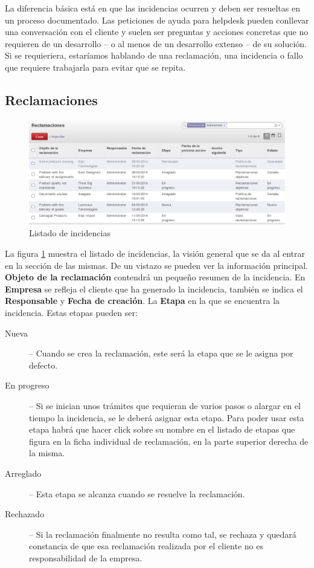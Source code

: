 La diferencia básica está en que las incidencias ocurren y deben ser resueltas en un proceso documentado. Las peticiones de ayuda para helpdesk pueden conllevar una conversación con el cliente y suelen ser preguntas y acciones concretas que no requieren de un desarrollo -- o al menos de un desarrollo extenso -- de su solución. Si se requieriera, estaríamos hablando de una reclamación, una incidencia o fallo
que requiere trabajarla para evitar que se repita.




\subsection{Reclamaciones}

\begin{figure}[H]
\includegraphics[width=\textwidth]{ventas/img/ven_reclista.png}
\caption{Listado de incidencias}
\label{ven:reclista}
\end{figure}

La figura \ref{ven:reclista} muestra el listado de incidencias, la visión general que se da al entrar en la sección de las mismas. De un
vistazo se pueden ver la información principal. \textbf{Objeto de la reclamación} contendrá un pequeño resumen de la incidencia. En 
\textbf{Empresa} se refleja el cliente que ha generado la incidencia, también se indica el \textbf{Responsable} y \textbf{Fecha de creación}.
La \textbf{Etapa} en la que se encuentra la incidencia. Estas etapas pueden ser:

\begin{description}
  \item[Nueva] -- Cuando se crea la reclamación, este será la etapa que se le asigna por defecto.
  \item[En progreso] -- Si se inician unos trámites que requieran de varios pasos o alargar en el tiempo la incidencia, se le deberá asignar
                     esta etapa. Para poder usar esta etapa habrá que hacer click sobre su nombre en el listado de etapas que figura en la 
                     ficha individual de reclamación, en la parte superior derecha de la misma.
  \item[Arreglado] -- Esta etapa se alcanza cuando se resuelve la reclamación.
  \item[Rechazado] -- Si la reclamación finalmente no resulta como tal, se rechaza y quedará constancia de que esa reclamación realizada
                      por el cliente no es responsabilidad de la empresa.
\end{description} 

